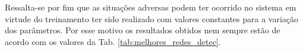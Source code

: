 Ressalta-se por fim que as situações adversas podem ter ocorrido no sistema em
virtude do treinamento ter sido realizado com valores constantes para a variação
dos parâmetros. Por esse motivo os resultados obtidos nem sempre estão de acordo
com os valores da Tab. \ref{tab:melhores_redes_detec}.



